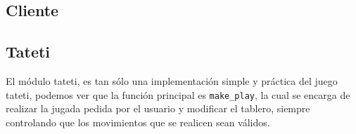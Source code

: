\documentclass[11pt]{article}
\begin{document}
\subsection*{Cliente}

\subsection*{Tateti}

El módulo tateti, es tan sólo una implementación simple y práctica del juego tateti, podemos ver
que la función principal es \texttt{make\_play}, la cual se encarga de realizar la jugada
pedida por el usuario y modificar el tablero, siempre controlando que los movimientos 
que se realicen sean válidos.
\end{document}
